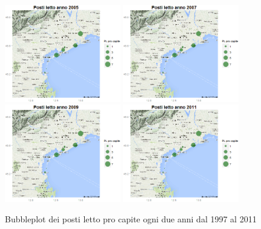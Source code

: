 \documentclass[a4paper,11pt,twoside,openright]{book}							%
\begin{document}
\begin{figure}[H]
	\includegraphics[trim=0cm 0cm 0cm 0cm,clip=true,width=0.45\textwidth]{Immagini/venezia_dati/PL2005.png}
	\includegraphics[trim=0cm 0cm 0cm 0cm,clip=true,width=0.45\textwidth]{Immagini/venezia_dati/PL2007.png}
	\includegraphics[trim=0cm 0cm 0cm 0cm,clip=true,width=0.45\textwidth]{Immagini/venezia_dati/PL2009.png}
	\includegraphics[trim=0cm 0cm 0cm 0cm,clip=true,width=0.45\textwidth]{Immagini/venezia_dati/PL2011.png}
	\caption{Bubbleplot dei posti letto pro capite ogni due anni dal 1997 al 2011}
	\label{fig:Ven_bubblePL}
\end{figure}
\end{document}
